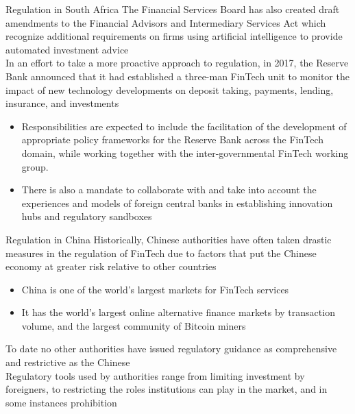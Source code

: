 \documentclass[10pt]{beamer}
\begin{document}

\begin{frame}{Regulation in South Africa}
	The Financial Services Board has also created draft amendments to the Financial Advisors and Intermediary Services Act which recognize additional requirements on firms using artificial intelligence to provide automated investment advice \\ \vspace{3mm}
	In an effort to take a more proactive approach to regulation, in 2017, the Reserve Bank announced that it had established a three-man FinTech unit to monitor the impact of new technology developments on deposit taking, payments, lending, insurance, and investments
	\begin{itemize}
		\item Responsibilities are expected to include the facilitation of the development of appropriate policy frameworks for the Reserve Bank across the FinTech domain, while working together with the inter-governmental FinTech working group.
		\item There is also a mandate to collaborate with and take into account the experiences and models of foreign central banks in establishing innovation hubs and regulatory sandboxes
	\end{itemize}
\end{frame}


\begin{frame}{Regulation in China}
	Historically, Chinese authorities have often taken drastic measures in the regulation of FinTech due to factors that put the Chinese economy at greater risk relative to other countries
	\begin{itemize}
		\item China is one of the world's largest markets for FinTech services
		\item It has the world's largest online alternative finance markets by transaction volume, and the largest community of Bitcoin miners
	\end{itemize}
	To date no other authorities have issued regulatory guidance as comprehensive and restrictive as the Chinese \\ \vspace{3mm}
	Regulatory tools used by authorities range from limiting investment by foreigners, to restricting the roles institutions can play in the market, and in some instances prohibition
\end{frame}
\end{document}
